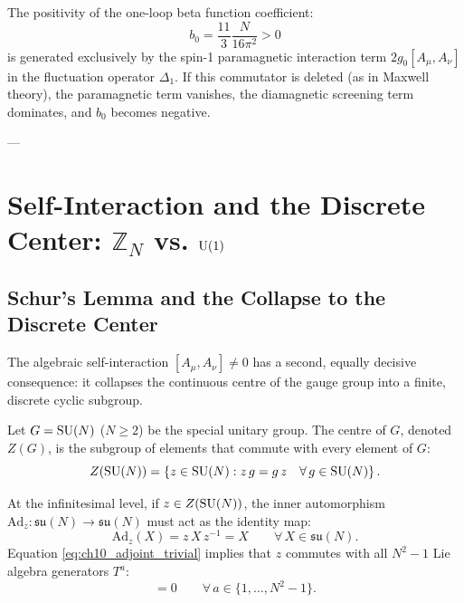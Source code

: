 \begin{theorem}
\label{thm:asymptotic_freedom_origin}
The positivity of the one-loop beta function coefficient:
\begin{equation}
b_0 = \frac{11}{3} \frac{N}{16\pi^2} > 0
\end{equation}
is generated exclusively by the spin-1 paramagnetic interaction term $2 g_0 [A_\mu, A_\nu]$ in the fluctuation operator $\Delta_1$. If this commutator is deleted (as in Maxwell theory), the paramagnetic term vanishes, the diamagnetic screening term dominates, and $b_0$ becomes negative.
\end{theorem}

---

\section{Self-Interaction and the Discrete Center: \texorpdfstring{$\mathbb{Z}_N$}{Z_N} vs. \texorpdfstring{$\mathrm{U}(1)$}{U(1)}}
\label{sec:selfint_discrete_centre}

\subsection{Schur's Lemma and the Collapse to the Discrete Center}
\label{subsec:schur_lemma_center}

The algebraic self-interaction $[A_\mu, A_\nu] \neq 0$ has a second, equally decisive consequence: it collapses the continuous centre of the gauge group into a finite, discrete cyclic subgroup.

Let $G = \mathrm{SU}(N)$ ($N \ge 2$) be the special unitary group. The centre of $G$, denoted $Z(G)$, is the subgroup of elements that commute with every element of $G$:
\begin{equation}
\label{eq:ch10_center_definition}
Z(\mathrm{SU}(N)) = \left\{ z \in \mathrm{SU}(N) : z \, g = g \, z \quad \forall \, g \in \mathrm{SU}(N) \right\}.
\end{equation}

At the infinitesimal level, if $z \in Z(\mathrm{SU}(N))$, the inner automorphism $\mathrm{Ad}_z : \mathfrak{su}(N) \to \mathfrak{su}(N)$ must act as the identity map:
\begin{equation}
\label{eq:ch10_adjoint_trivial}
\mathrm{Ad}_z(X) = z \, X \, z^{-1} = X \qquad \forall \, X \in \mathfrak{su}(N).
\end{equation}
Equation \eqref{eq:ch10_adjoint_trivial} implies that $z$ commutes with all $N^2-1$ Lie algebra generators $T^a$:
\begin{equation}
[z, T^a] = 0 \qquad \forall \, a \in \{1, \dots, N^2-1\}.
\end{equation}

